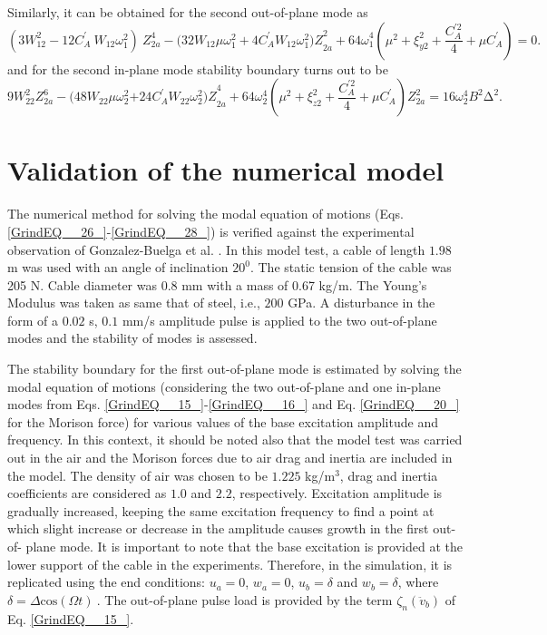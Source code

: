 \documentclass[review]{elsarticle}
\begin{document}
Similarly, it can be obtained for the second out-of-plane mode as
\begin{equation} \label{GrindEQ__47_} 
(3W^2_{12}-12C^{'}_A\ W_{12}{\omega }^2_1)\ Z^4_{2a}-(32W_{12}\mu {\omega }^2_1+4C^{'}_A{W_{12}{\omega }^2_1)Z}^2_{2a} 
+6{4\omega }^4_1\left({\mu }^2+{\xi }^2_{y2}+\frac{C^{'2}_A}{4}+\mu C^{'}_A\right)=0.     
\end{equation} 
and for the second in-plane mode stability boundary turns out to be
\begin{equation} \label{GrindEQ__48_} 
9W^2_{22}Z^6_{2a}-(48W_{22}\mu {\omega }^2_2{+24C^{'}_AW_{22}{\omega }^2_2)Z}^4_{2a}+64{\omega }^4_2\left({\mu }^2+{\xi }^2_{z2}+\frac{C^{'2}_A}{4}+\mu C^{'}_A\right)Z^2_{2a}=16{\omega }^4_2B^2{\mathrm{\Delta }}^2.  
\end{equation} 
\section{Validation of the numerical model}
The numerical method for solving the modal equation of motions (Eqs. \eqref{GrindEQ__26_}-\eqref{GrindEQ__28_}) is verified against the experimental observation of Gonzalez-Buelga et al. \cite{Gonzalez_2008}. In this model test, a cable of length $1.98$ m was used with an angle of inclination $20^{0}$. The static tension of the cable was 205 N. Cable diameter was $0.8$ mm with a mass of 0.67 kg/m. The Young's Modulus was taken as same that of steel, i.e., $200$ GPa. A disturbance in the form of a $0.02$ s, $0.1$ mm/s amplitude pulse is applied to the two out-of-plane modes and the stability of modes is assessed.

The stability boundary for the first out-of-plane mode is estimated by solving the modal equation of motions (considering the two out-of-plane and one in-plane modes from Eqs. \eqref{GrindEQ__15_}-\eqref{GrindEQ__16_} and Eq. \eqref{GrindEQ__20_} for the Morison force) for various values of the base excitation amplitude and frequency. In this context, it should be noted also that the model test was carried out in the air and the Morison forces due to air drag and inertia are included in the model. The density of air was chosen to be $1.225$ kg/m$^{3}$, drag and inertia coefficients are considered as $1.0$ and $2.2$, respectively. Excitation amplitude is gradually increased, keeping the same excitation frequency to find a point at which slight increase or decrease in the amplitude causes growth in the first out-of- plane mode. It is important to note that the base excitation is provided at the lower support of the cable in the experiments. Therefore, in the simulation, it is replicated using the end conditions: $u_a=0$, $w_a=0$, $u_b=\delta $ and $w_b=\delta $, where $\delta =\Delta{\text{cos} (\Omega t)\ }$. The out-of-plane pulse load is provided by the term ${\zeta}_n\left({\ddot{v}}_b\right)$ of Eq. \eqref{GrindEQ__15_}.
\end{document}
